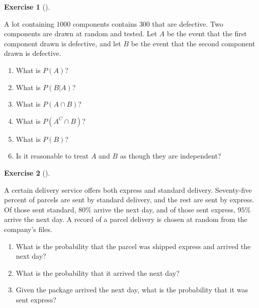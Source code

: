 \documentclass[
  letterpaper,
  DIV=11,
  numbers=noendperiod]{scrreprt}
\providecommand{\tightlist}{%
  \setlength{\itemsep}{0pt}\setlength{\parskip}{0pt}}\usepackage{longtable,booktabs,array}
\theoremstyle{definition}
\theoremstyle{definition}
\newtheorem{exercise}{Exercise}[chapter]
\theoremstyle{definition}
\theoremstyle{remark}
\begin{document}
\begin{exercise}[]\protect\hypertarget{exr-4.9}{}\label{exr-4.9}

A lot containing \(1000\) components contains \(300\) that are
defective. Two components are drawn at random and tested. Let \(A\) be
the event that the first component drawn is defective, and let \(B\) be
the event that the second component drawn is defective.

\begin{enumerate}
\def\labelenumi{\alph{enumi}.}
\tightlist
\item
  What is \(P(A)\)?
\item
  What is \(P(B|A)\)?
\item
  What is \(P(A \cap B)\)?
\item
  What is \(P(A^C \cap B)\)?
\item
  What is \(P(B)\)?
\item
  Is it reasonable to treat \(A\) and \(B\) as though they are
  independent?
\end{enumerate}

\end{exercise}

\begin{exercise}[]\protect\hypertarget{exr-4.10}{}\label{exr-4.10}

A certain delivery service offers both express and standard delivery.
Seventy-five percent of parcels are sent by standard delivery, and the
rest are sent by express. Of those sent standard, \(80\%\) arrive the
next day, and of those sent express, \(95\%\) arrive the next day. A
record of a parcel delivery is chosen at random from the company's
files.

\begin{enumerate}
\def\labelenumi{\alph{enumi}.}
\tightlist
\item
  What is the probability that the parcel was shipped express and
  arrived the next day?
\item
  What is the probability that it arrived the next day?
\item
  Given the package arrived the next day, what is the probability that
  it was sent express?
\end{enumerate}

\end{exercise}
\end{document}
